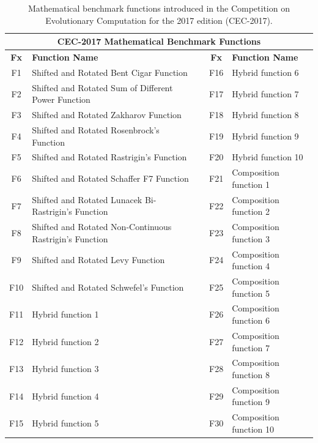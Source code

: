 \documentclass[graybox]{svmult}
\begin{document}
    \begin{table}[]
    \scriptsize
    \centering
    \caption{Mathematical benchmark functions introduced in the Competition on Evolutionary Computation for the 2017 edition (CEC-2017).}\label{tab.benchmark_functions}    
    \begin{tabular}{@{}cllcl@{}}
    \toprule
    \multicolumn{5}{c}{\textbf{CEC-2017 Mathematical Benchmark Functions}} \\ \midrule
    \textbf{Fx} & \textbf{Function Name} &  & \textbf{Fx} & \textbf{Function Name} \\
    F1 & Shifted and Rotated   Bent Cigar Function &  & F16 & Hybrid function 6 \\
    F2 & Shifted and Rotated   Sum of Different Power Function &  & F17 & Hybrid function 7 \\
    F3 & Shifted and Rotated   Zakharov Function &  & F18 & Hybrid function 8 \\
    F4 & Shifted and Rotated   Rosenbrock's Function &  & F19 & Hybrid function 9 \\
    F5 & Shifted and Rotated   Rastrigin's Function &  & F20 & Hybrid function 10 \\
    F6 & Shifted and Rotated   Schaffer F7 Function &  & F21 & Composition function   1 \\
    F7 & Shifted and Rotated   Lunacek Bi-Rastrigin's Function &  & F22 & Composition function   2 \\
    F8 & Shifted and Rotated   Non-Continuous Rastrigin's Function &  & F23 & Composition function   3 \\
    F9 & Shifted and Rotated   Levy Function &  & F24 & Composition function   4 \\
    F10 & Shifted and Rotated   Schwefel's Function &  & F25 & Composition function   5 \\
    F11 & Hybrid function 1 &  & F26 & Composition function   6 \\
    F12 & Hybrid function 2 &  & F27 & Composition function   7 \\
    F13 & Hybrid function 3 &  & F28 & Composition function   8 \\
    F14 & Hybrid function 4 &  & F29 & Composition function   9 \\
    F15 & Hybrid function 5 &  & F30 & Composition function   10 \\ \bottomrule
    \end{tabular}
    \end{table}
\end{document}
